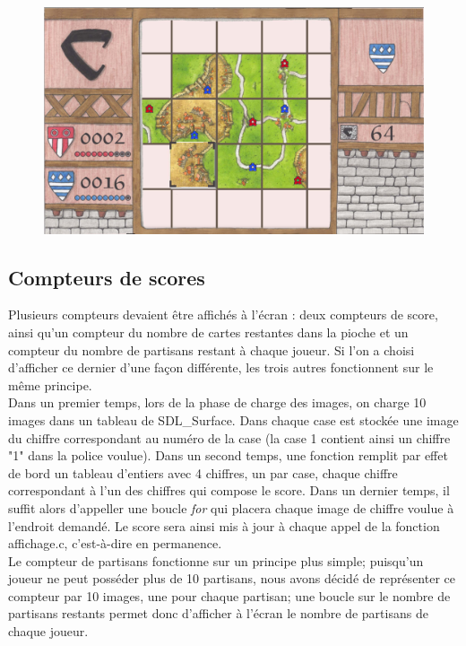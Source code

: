 \documentclass[a4paper, 11pt]{article}
\begin{document}
\begin{figure}
\centering
\includegraphics[width = \textwidth]{img/jeu-en-cours.png}
\end{figure}

\subsection{Compteurs de scores}
\indent Plusieurs compteurs devaient être affichés à l'écran : deux compteurs de score, ainsi qu'un compteur du nombre de cartes restantes dans la pioche et un compteur du nombre de partisans restant à chaque joueur. Si l'on a choisi d'afficher ce dernier d'une façon différente, les trois autres fonctionnent sur le même principe. \\
\indent Dans un premier temps, lors de la phase de charge des images, on charge 10 images dans un tableau de SDL\_Surface. Dans chaque case est stockée une image du chiffre correspondant au numéro de la case (la case 1 contient ainsi un chiffre "1" dans la police voulue). Dans un second temps, une fonction remplit par effet de bord un tableau d'entiers avec 4 chiffres, un par case, chaque chiffre correspondant à l'un des chiffres qui compose le score. Dans un dernier temps, il suffit alors d'appeller une boucle \emph{for} qui placera chaque image de chiffre voulue à l'endroit demandé. Le score sera ainsi mis à jour à chaque appel de la fonction affichage.c, c'est-à-dire en permanence. \\
\indent Le compteur de partisans fonctionne sur un principe plus simple; puisqu'un joueur ne peut posséder plus de 10 partisans, nous avons décidé de représenter ce compteur par 10 images, une pour chaque partisan; une boucle sur le nombre de partisans restants permet donc d'afficher à l'écran le nombre de partisans de chaque joueur.
\end{document}
